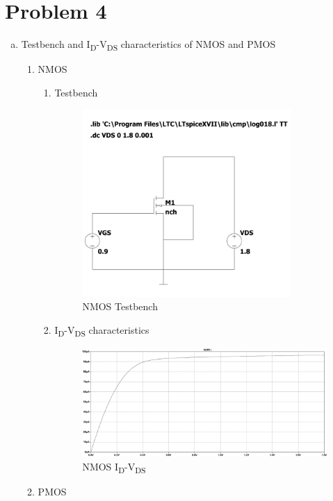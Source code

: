 \documentclass{article}
\begin{document}
\section{Problem 4}
\label{sec:org2889fa9}
\begin{enumerate}[(a)]
\item Testbench and I\textsubscript{D}-V\textsubscript{DS} characteristics of NMOS and PMOS
\begin{enumerate}[1.]
\item NMOS
\begin{enumerate}
\item Testbench
\begin{figure}[H]
\centering
\includegraphics[width=300px]{img/q4/a/nmos-testbench.pdf}
\caption{\label{fig:nmos-testbench-2}NMOS Testbench}
\end{figure}
\item I\textsubscript{D}-V\textsubscript{DS} characteristics
\begin{figure}[H]
\centering
\includegraphics[width=.9\linewidth]{img/q4/a/nmos-id-vds.pdf}
\caption{\label{fig:nmos-id-vds}NMOS I\textsubscript{D}-V\textsubscript{DS}}
\end{figure}
\end{enumerate}
\item PMOS
\begin{enumerate}

\end{enumerate}
\end{enumerate}
\end{enumerate}
\end{document}
